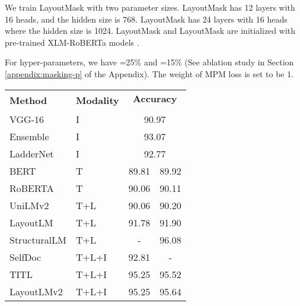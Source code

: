 \documentclass[11pt]{article}
\begin{document}
We train LayoutMask with two parameter sizes. LayoutMask has 12 layers with 16 heads, and the hidden size is 768.
LayoutMask has 24 layers with 16 heads where the hidden size is 1024.
LayoutMask and LayoutMask are initialized with pre-trained XLM-RoBERTa models \citep{conneau2020unsupervised}.

For hyper-parameters, we have =25\% and =15\% (See ablation study in Section \ref{appendix:masking-p} of the Appendix). The weight of MPM loss  is set to be 1.

\begin{table}[]
\centering
\scriptsize
\begin{tabular}{l|l|cc}
\hline
\multirow{2}{*}{\textbf{Method}} & \multirow{2}{*}{\textbf{Modality}} & \multicolumn{2}{c}{\textbf{Accuracy}}       \\ \cline{3-4} 
                        &                           & \multicolumn{1}{c|}{}  &\\ \hline
VGG-16 \citep{afzal2017cutting}                 & I                         & \multicolumn{2}{c}{90.97}          \\
Ensemble    \citep{das2018document}           & I                         & \multicolumn{2}{c}{93.07}   \\ 
LadderNet   \citep{sarkhel2019deterministic}            & I                         & \multicolumn{2}{c}{92.77}          \\ \hline
BERT     \citep{kenton2019bert}                 & T                         & \multicolumn{1}{c|}{89.81} & 89.92 \\
RoBERTA      \citep{liu2019roberta}               & T                         & \multicolumn{1}{c|}{90.06} & 90.11 \\ \hline
UniLMv2      \citep{bao2020unilmv2}              & T+L                       & \multicolumn{1}{c|}{90.06} & 90.20 \\
LayoutLM  \citep{xu2020layoutlm}               & T+L                       & \multicolumn{1}{c|}{91.78} & 91.90 \\
StructuralLM     \citep{li2021structurallm}       & T+L                       & \multicolumn{1}{c|}{-}     & 96.08 \\ \hline
SelfDoc   \citep{li2021selfdoc}              & T+L+I                     & \multicolumn{1}{c|}{92.81} & -     \\
TITL       \citep{powalski2021going}                  & T+L+I                     & \multicolumn{1}{c|}{95.25} & 95.52 \\
LayoutLMv2   \citep{xu2021layoutlmv2}           & T+L+I                     & \multicolumn{1}{c|}{95.25} & 95.64 \\

\end{tabular}
\end{table}
\end{document}
